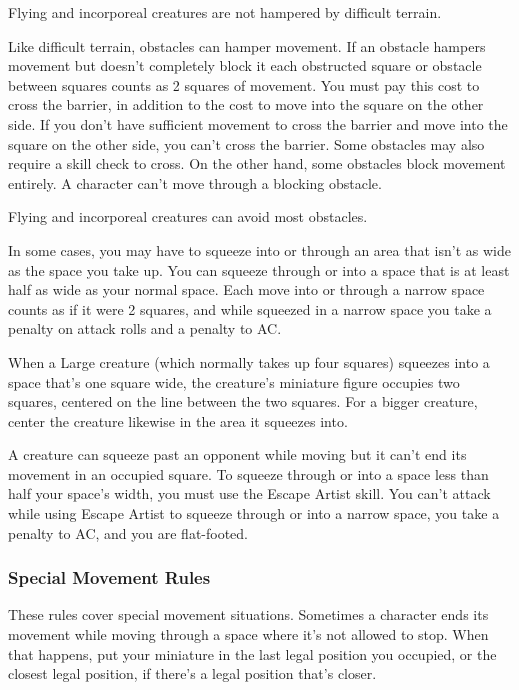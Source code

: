Flying and incorporeal creatures are not hampered by difficult terrain.

 Like difficult terrain, obstacles can hamper movement. If an obstacle hampers movement but doesn't completely block it each obstructed square or obstacle between squares counts as 2 squares of movement. You must pay this cost to cross the barrier, in addition to the cost to move into the square on the other side. If you don't have sufficient movement to cross the barrier and move into the square on the other side, you can't cross the barrier. Some obstacles may also require a skill check to cross. On the other hand, some obstacles block movement entirely. A character can't move through a blocking obstacle.

Flying and incorporeal creatures can avoid most obstacles.

 In some cases, you may have to squeeze into or through an area that isn't as wide as the space you take up. You can squeeze through or into a space that is at least half as wide as your normal space. Each move into or through a narrow space counts as if it were 2 squares, and while squeezed in a narrow space you take a  penalty on attack rolls and a  penalty to AC.

When a Large creature (which normally takes up four squares) squeezes into a space that's one square wide, the creature's miniature figure occupies two squares, centered on the line between the two squares. For a bigger creature, center the creature likewise in the area it squeezes into.

A creature can squeeze past an opponent while moving but it can't end its movement in an occupied square.
To squeeze through or into a space less than half your space's width, you must use the Escape Artist skill. You can't attack while using Escape Artist to squeeze through or into a narrow space, you take a  penalty to AC, and you are flat-footed.

\subsubsection{Special Movement Rules}
These rules cover special movement situations.
 Sometimes a character ends its movement while moving through a space where it's not allowed to stop. When that happens, put your miniature in the last legal position you occupied, or the closest legal position, if there's a legal position that's closer.

